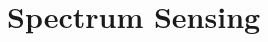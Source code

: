 \documentclass[12pt,a4paper]{article}
\begin{document}
\section{Spectrum Sensing}
\begin{comment}

\begin{figure}[ht!]
\centering
	\texttt{[image: images\_files/Aufgabe3\_aktualisiert.png]}
	\caption{Grafik 2}
	\label{fig:YourLabe4}
\href{https://www.amazon.de/EW-101-Electronic-Warfare-Library/dp/1580531695}{Quelle Skizze (Ohne farbige Notizen)}
\end{figure}



\subsection*{a)}
Maßeinheiten werden der besseren Übersicht halber ausgelassen in den Rechenwegen, aber nicht in den Endergebnissen selbst bei den Teilaufgaben a), b) sowie c)!\\\\
Orientiert man sich an der Formel aus dem mitgegebenen Dokument \textit{zsmfssg\_U1.pdf}, dann berechnet sich der Verlust in dB wie folgt:\\\\
$20*log_{10}(r*f*\dfrac{4\pi}{c})$, wobei r die Distanz in Metern, 120000, f die Frequenz in Hz, hier $10^{\hspace{0.8mm}9}$ und c
\\\\die Lichtgeschwindigkeit in m/s, also 299792458.\\\\
Wir setzen ein:\\
$20*log_{10}(120000*10^{\hspace{0.8mm}9}*\dfrac{4\pi}{299792458})\thickapprox134.03$. 
\subsubsection*{i) Matrikelnummer mit 22 am Ende}
Rechnung für die Matrikelnummer die mit 22 endet:\\\\
$X-134,03=22$
\\
$ \equiv 156,03 = X$.\\\\
Daraus folgt, dass X etwa 156,03 dBm stark sein sollte.
\subsubsection*{ii) Matrikelnummer mit 30 am Ende}
Rechnung für die Matrikelnummer die mit 22 endet:\\\\
$X-134,03=30$
\\
$ \equiv 164,03 = X$.\\\\
Daraus folgt, dass X etwa 164,03 dBm stark sein sollte.


\end{comment}
\end{document}
